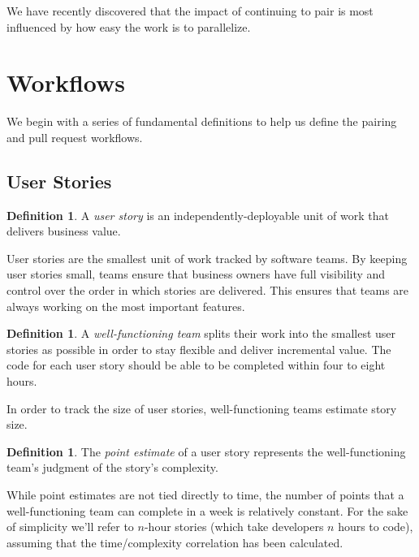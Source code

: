 \documentclass[letterpaper]{article}
\theoremstyle{definition}
\newtheorem{definition}[theorem]{Definition}
\begin{document}
    We have recently discovered that the impact of continuing to pair is most influenced by how easy the work is to
    parallelize.


    \section{Workflows}\label{sec:workflows}

    We begin with a series of fundamental definitions to help us define the pairing and pull request workflows.

    \subsection{User Stories}\label{subsec:user-stories}

    \begin{definition}
        A \textit{user story} is an independently-deployable unit of work that delivers business value.
    \end{definition}

    User stories are the smallest unit of work tracked by software teams.
    By keeping user stories small, teams ensure that business owners have full visibility and control over the order
    in which stories are delivered.
    This ensures that teams are always working on the most important features.

    \begin{definition}
        A \textit{well-functioning team} splits their work into the smallest user stories as possible in order to stay
        flexible and deliver incremental value.
        The code for each user story should be able to be completed within four to eight hours.
    \end{definition}

    In order to track the size of user stories, well-functioning teams estimate story size.

    \begin{definition}
        The \textit{point estimate} of a user story represents the well-functioning team's judgment of the story's
        complexity.
    \end{definition}

    While point estimates are not tied directly to time, the number of points that a well-functioning team can complete
    in a week is relatively constant.
    For the sake of simplicity we'll refer to $n$-hour stories (which take developers $n$ hours to code), assuming that
    the time/complexity correlation has been calculated.
\end{document}
